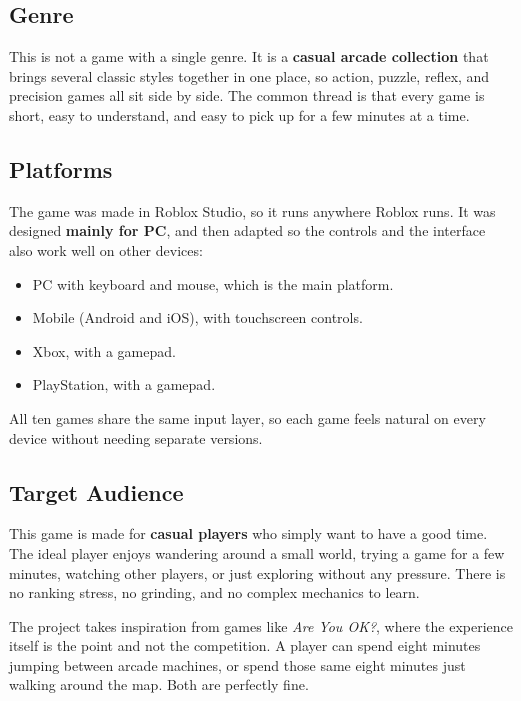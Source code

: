 \documentclass[12pt,letterpaper]{article}
\begin{document}
\subsection{Genre}

This is not a game with a single genre. It is a \textbf{casual arcade collection} that brings several classic styles together in one place, so action, puzzle, reflex, and precision games all sit side by side. The common thread is that every game is short, easy to understand, and easy to pick up for a few minutes at a time.

\subsection{Platforms}

The game was made in Roblox Studio, so it runs anywhere Roblox runs. It was designed \textbf{mainly for PC}, and then adapted so the controls and the interface also work well on other devices:

\begin{itemize}
  \item PC with keyboard and mouse, which is the main platform.
  \item Mobile (Android and iOS), with touchscreen controls.
  \item Xbox, with a gamepad.
  \item PlayStation, with a gamepad.
\end{itemize}

All ten games share the same input layer, so each game feels natural on every device without needing separate versions.

\subsection{Target Audience}

This game is made for \textbf{casual players} who simply want to have a good time. The ideal player enjoys wandering around a small world, trying a game for a few minutes, watching other players, or just exploring without any pressure. There is no ranking stress, no grinding, and no complex mechanics to learn.

The project takes inspiration from games like \textit{Are You OK?}, where the experience itself is the point and not the competition. A player can spend eight minutes jumping between arcade machines, or spend those same eight minutes just walking around the map. Both are perfectly fine.
\end{document}
